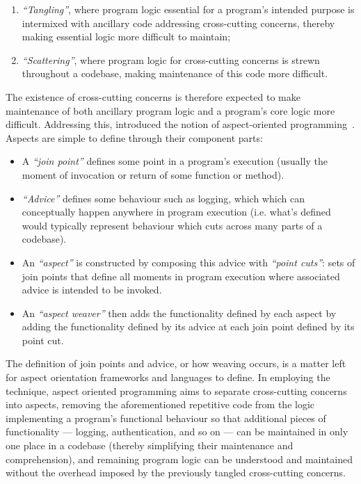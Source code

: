 \begin{enumerate}
    \item \emph{``Tangling''}, where program logic essential for
    a program's intended purpose is intermixed with ancillary code addressing
    cross-cutting concerns, thereby making essential logic more difficult to
    maintain;
    \item \emph{``Scattering''}, where program logic for
    cross-cutting concerns is strewn throughout a codebase, making maintenance
    of this code more difficult.
\end{enumerate}

The existence of cross-cutting concerns is therefore expected to make maintenance
of both ancillary program logic and a program's core logic more difficult.
Addressing this, \citeauthor{kiczales1997aspect} introduced the notion of
aspect-oriented programming~\cite{kiczales1997aspect}. Aspects are simple to
define through their component parts:

\begin{itemize}
    \item A \emph{``join point''} defines some point in a program's execution
(usually the moment of invocation or return of some function or method).
    \item \emph{``Advice''} defines some behaviour such as logging, which
    which can conceptually happen anywhere in program execution (i.e. what's defined
    would typically represent behaviour which cuts across many parts of a
    codebase).
    \item An \emph{``aspect''} is constructed by composing this advice with
    \emph{``point cuts''}: sets of join points that define all moments in
    program execution where associated advice is intended to be invoked.
    \item An \emph{``aspect weaver''} then adds the functionality defined by
    each aspect by adding the functionality defined by its advice at each join
    point defined by its point cut.
\end{itemize}

The definition of join points and advice, or how weaving occurs, is a matter
left for aspect orientation frameworks and languages to define. In employing the
technique, aspect oriented programming aims to separate cross-cutting concerns
into aspects, removing the aforementioned repetitive code from the logic
implementing a program's functional behaviour so that additional pieces of
functionality --- logging, authentication, and so on --- can be maintained in
only one place in a codebase (thereby simplifying their maintenance and
comprehension), and remaining program logic can be understood and maintained
without the overhead imposed by the previously tangled cross-cutting concerns.

